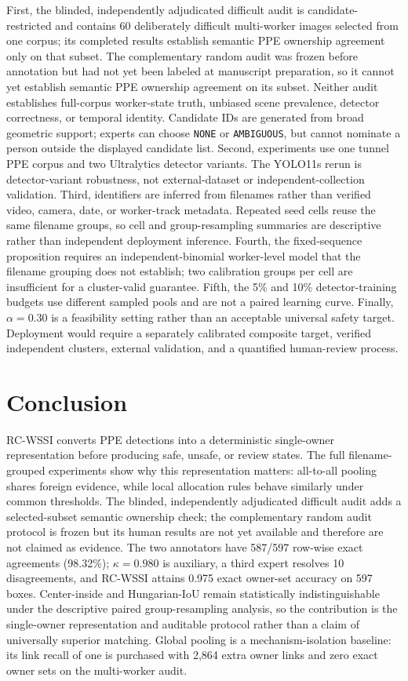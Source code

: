 \documentclass[iicol,pdflatex,sn-mathphys-num]{sn-jnl}
\begin{document}
First, the blinded, independently adjudicated difficult audit is candidate-restricted and contains 60 deliberately difficult multi-worker images selected from one corpus; its completed results establish semantic PPE ownership agreement only on that subset. The complementary random audit was frozen before annotation but had not yet been labeled at manuscript preparation, so it cannot yet establish semantic PPE ownership agreement on its subset. Neither audit establishes full-corpus worker-state truth, unbiased scene prevalence, detector correctness, or temporal identity. Candidate IDs are generated from broad geometric support; experts can choose \texttt{NONE} or \texttt{AMBIGUOUS}, but cannot nominate a person outside the displayed candidate list. Second, experiments use one tunnel PPE corpus and two Ultralytics detector variants. The YOLO11s rerun is detector-variant robustness, not external-dataset or independent-collection validation. Third, identifiers are inferred from filenames rather than verified video, camera, date, or worker-track metadata. Repeated seed cells reuse the same filename groups, so cell and group-resampling summaries are descriptive rather than independent deployment inference. Fourth, the fixed-sequence proposition requires an independent-binomial worker-level model that the filename grouping does not establish; two calibration groups per cell are insufficient for a cluster-valid guarantee. Fifth, the 5\% and 10\% detector-training budgets use different sampled pools and are not a paired learning curve. Finally, $\alpha=0.30$ is a feasibility setting rather than an acceptable universal safety target. Deployment would require a separately calibrated composite target, verified independent clusters, external validation, and a quantified human-review process.

\section{Conclusion}\label{sec:conclusion}

RC-WSSI converts PPE detections into a deterministic single-owner representation before producing safe, unsafe, or review states. The full filename-grouped experiments show why this representation matters: all-to-all pooling shares foreign evidence, while local allocation rules behave similarly under common thresholds. The blinded, independently adjudicated difficult audit adds a selected-subset semantic ownership check; the complementary random audit protocol is frozen but its human results are not yet available and therefore are not claimed as evidence. The two annotators have 587/597 row-wise exact agreements (98.32\%); $\kappa=0.980$ is auxiliary, a third expert resolves 10 disagreements, and RC-WSSI attains 0.975 exact owner-set accuracy on 597 boxes. Center-inside and Hungarian-IoU remain statistically indistinguishable under the descriptive paired group-resampling analysis, so the contribution is the single-owner representation and auditable protocol rather than a claim of universally superior matching. Global pooling is a mechanism-isolation baseline: its link recall of one is purchased with 2,864 extra owner links and zero exact owner sets on the multi-worker audit.
\end{document}
